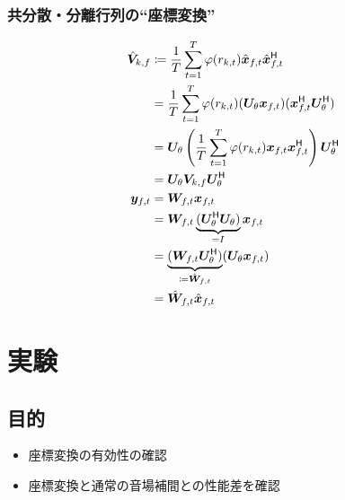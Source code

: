 \documentclass[sip,biber]{now-journal}
\begin{document}
\subsubsection{共分散・分離行列の``座標変換''}
\begin{align}
  \rot{\cov} _{\src,\freq} &\coloneqq \frac{1}{\Tframe} \sum _{\tframe = 1} ^{\Tframe} \weight (\var _{\src,\tframe}) \rotObs _{\ft} \rotObs _{\ft} ^{\hermite} \\
                           &= \frac{1}{\Tframe} \sum _{\tframe = 1} ^{\Tframe} \weight (\var _{\src,\tframe}) (\rotMat _{\rotDeg} \Obs _{\ft}) (\Obs _{\ft} ^{\hermite} \rotMat _{\rotDeg} ^{\hermite}) \\
                           &= \rotMat _{\rotDeg} \left(\frac{1}{\Tframe} \sum _{\tframe = 1} ^{\Tframe} \weight (\var _{\src,\tframe}) \Obs _{\ft} \Obs _{\ft} ^{\hermite}\right) \rotMat _{\rotDeg} ^{\hermite} \\
                           &= \rotMat _{\rotDeg} \cov _{\src,\freq} \rotMat _{\rotDeg} ^{\hermite}
  \\
  \Est _{\ft} &= \Demix _{\ft} \Obs _{\ft} \\
              &= \Demix _{\ft} \underbrace{(\rotMat _{\rotDeg} ^{\hermite} \rotMat _{\rotDeg})}_{=I} \Obs _{\ft} \\
              &= \underbrace{(\Demix _{\ft} \rotMat _{\rotDeg} ^{\hermite})}_{\coloneqq \rotDemix _{\ft}} (\rotMat _{\rotDeg} \Obs _{\ft}) \\
              &= \rotDemix _{\ft} \rotObs _{\ft}
\end{align}

\section{実験}
\subsection*{目的}
\begin{itemize}
  \item 座標変換の有効性の確認
  \item 座標変換と通常の音場補間との性能差を確認
\end{itemize}
\end{document}

